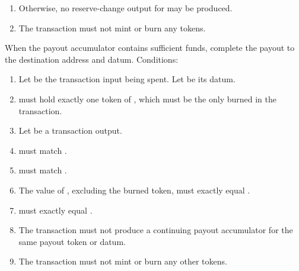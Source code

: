 \documentclass[../midgard.tex]{subfiles}
\begin{document}
\begin{description}
\begin{enumerate}
\begin{itemize}
        \end{itemize}
      \item Otherwise, no reserve-change output for  may be produced.
      \item The transaction must not mint or burn any tokens.
    \end{enumerate}
  \item[Complete Payout.] When the payout accumulator contains sufficient funds, complete the payout to the destination address and datum.
    Conditions:
    \begin{enumerate}
      \item Let  be the transaction input being spent.
        Let  be its datum.
      \item {} must hold exactly one token of , which must be the only  burned in the transaction.
      \item Let  be a transaction output.
      \item {} must match .
      \item {} must match .
      \item The value of , excluding the burned  token, must exactly equal .
      \item {} must exactly equal .
      \item The transaction must not produce a continuing payout accumulator for the same payout token or datum.
      \item The transaction must not mint or burn any other tokens.
    \end{enumerate}
\end{description}
\end{document}
